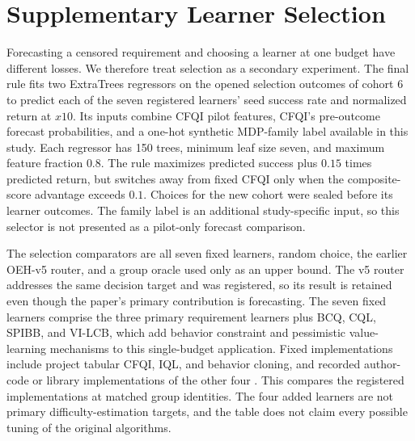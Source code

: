 \section{Supplementary Learner Selection}
\label{sec:supplement-selection}
Forecasting a censored requirement and choosing a learner at one budget have different losses. We therefore treat selection as a secondary experiment. The final rule fits two ExtraTrees regressors on the opened selection outcomes of cohort 6 to predict each of the seven registered learners' seed success rate and normalized return at $x10$. Its inputs combine CFQI pilot features, CFQI's pre-outcome \OEH{} forecast probabilities, and a one-hot synthetic MDP-family label available in this study. Each regressor has 150 trees, minimum leaf size seven, and maximum feature fraction $0.8$. The rule maximizes predicted success plus $0.15$ times predicted return, but switches away from fixed CFQI only when the composite-score advantage exceeds $0.1$. Choices for the new cohort were sealed before its learner outcomes. The family label is an additional study-specific input, so this selector is not presented as a pilot-only forecast comparison.

The selection comparators are all seven fixed learners, random choice, the earlier OEH-v5 router, and a group oracle used only as an upper bound. The v5 router addresses the same decision target and was registered, so its result is retained even though the paper's primary contribution is forecasting. The seven fixed learners comprise the three primary requirement learners plus BCQ, CQL, SPIBB, and VI-LCB, which add behavior constraint and pessimistic value-learning mechanisms to this single-budget application. Fixed implementations include project tabular CFQI, IQL, and behavior cloning, and recorded author-code or library implementations of the other four \cite{fujimoto2019bcq,kumar2020cql,kostrikov2022iql,laroche2019spibb,li2024sample}. This compares the registered implementations at matched group identities. The four added learners are not primary difficulty-estimation targets, and the table does not claim every possible tuning of the original algorithms.

